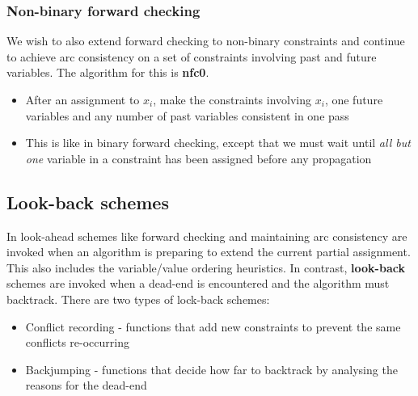 \documentclass[CS4402-Notes.tex]{subfiles}
\begin{document}
\subsubsection{Non-binary forward checking}
We wish to also extend forward checking to non-binary constraints and continue to achieve arc consistency on a set of constraints involving past and future variables. The algorithm for this is \textbf{nfc0}.
\begin{itemize}
\item After an assignment to $x_i$, make the constraints involving $x_i$, one future variables and any number of past variables consistent in one pass
\item This is like in binary forward checking, except that we must wait until \textit{all but one} variable in a constraint has been assigned before any propagation
\end{itemize}


\subsection{Look-back schemes}
In look-ahead schemes like forward checking and maintaining arc consistency are invoked when an algorithm is preparing to extend the current partial assignment. This also includes the variable/value ordering heuristics. In contrast, \textbf{look-back} schemes are invoked when a dead-end is encountered and the algorithm must backtrack.
\n
There are two types of lock-back schemes:
\begin{itemize}
\item Conflict recording - functions that add new constraints to prevent the same conflicts re-occurring
  \item Backjumping - functions that decide how far to backtrack by analysing the reasons for the dead-end
\end{itemize}
\end{document}
